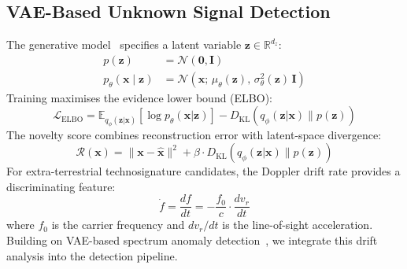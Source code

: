 \documentclass[sensors,article,submit,pdftex]{mdpi}
\newcommand{\vect}[1]{\boldsymbol{#1}}
\newcommand{\mat}[1]{\mathbf{#1}}
\newcommand{\R}{\mathbb{R}}
\newcommand{\E}{\mathbb{E}}
\begin{document}
\subsection{VAE-Based Unknown Signal Detection}
The generative model~\cite{kingma2014} specifies a latent variable $\vect{z} \in \R^{d_z}$:
\begin{align}
    p(\vect{z}) &= \mathcal{N}(\vect{0}, \mat{I}) \label{eq:prior} \\
    p_\theta(\vect{x} \mid \vect{z}) &= \mathcal{N}(\vect{x};\, \mu_\theta(\vect{z}),\, \sigma_\theta^2(\vect{z})\, \mat{I}) \label{eq:decoder}
\end{align}
Training maximises the evidence lower bound (ELBO):
\begin{equation}
    \mathcal{L}_{\text{ELBO}} = \E_{q_\phi(\vect{z}|\vect{x})} \!\left[ \log p_\theta(\vect{x}|\vect{z}) \right] - D_{\text{KL}}\!\left( q_\phi(\vect{z}|\vect{x}) \| p(\vect{z}) \right)
    \label{eq:elbo}
\end{equation}
The novelty score combines reconstruction error with latent-space divergence:
\begin{equation}
    \mathcal{R}(\vect{x}) = \|\vect{x} - \hat{\vect{x}}\|^2 + \beta \cdot D_{\text{KL}}(q_\phi(\vect{z}|\vect{x}) \| p(\vect{z}))
    \label{eq:novelty}
\end{equation}
For extra-terrestrial technosignature candidates, the Doppler drift rate provides a discriminating feature:
\begin{equation}
    \dot{f} = \frac{df}{dt} = -\frac{f_0}{c} \cdot \frac{dv_r}{dt}
    \label{eq:doppler}
\end{equation}
where $f_0$ is the carrier frequency and $dv_r/dt$ is the line-of-sight acceleration. Building on VAE-based spectrum anomaly detection~\cite{park2024vae}, we integrate this drift analysis into the detection pipeline.
\end{document}
